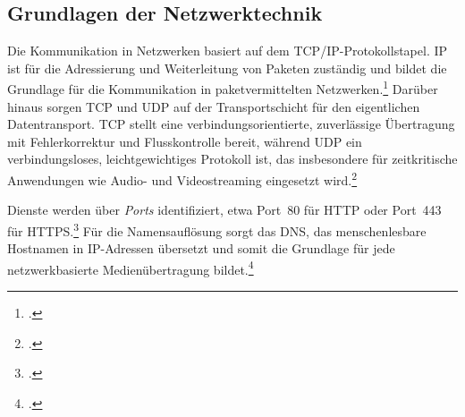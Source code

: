 \documentclass[12pt,a4paper]{report}
\begin{document}
  \subsection{Grundlagen der Netzwerktechnik}  
  Die Kommunikation in Netzwerken basiert auf dem \ac{TCP}/\ac{IP}-Protokollstapel. 
  \ac{IP} ist für die Adressierung und Weiterleitung von Paketen zuständig 
  und bildet die Grundlage für die Kommunikation in paketvermittelten Netzwerken.\footcite[Vgl.][S.~438]{tanenbaum_computernetworks}  
  Darüber hinaus sorgen \ac{TCP} und \ac{UDP} 
  auf der Transportschicht für den eigentlichen Datentransport. 
  \ac{TCP} stellt eine verbindungsorientierte, zuverlässige Übertragung mit Fehlerkorrektur und Flusskontrolle bereit, 
  während \ac{UDP} ein verbindungsloses, leichtgewichtiges Protokoll ist, 
  das insbesondere für zeitkritische Anwendungen wie Audio- und Videostreaming eingesetzt wird.\footcite[Vgl.][S.~228]{kurose_networking}
 
  Dienste werden über \emph{Ports} identifiziert, etwa Port~80 für \ac{HTTP} oder Port~443 für \ac{HTTPS}.\footcite[Vgl.][S.~554]{tanenbaum_computernetworks}  
  Für die Namensauflösung sorgt das \ac{DNS}, 
  das menschenlesbare Hostnamen in IP-Adressen übersetzt 
  und somit die Grundlage für jede netzwerkbasierte Medienübertragung bildet.\footcite[Vgl.][S.~611~f.]{tanenbaum_computernetworks}  
\end{document}
